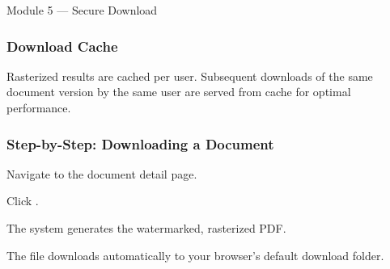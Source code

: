 \begin{ugModule}{Module 5 --- Secure Download}
  \subsubsection*{Download Cache}
  Rasterized results are cached per user. Subsequent downloads
  of the same document version by the same user are served from
  cache for optimal performance.

  \subsubsection*{Step-by-Step: Downloading a Document}
  \begin{ugSteps}
    \item Navigate to the document detail page.
    \item Click .
    \item The system generates the watermarked, rasterized PDF.
    \item The file downloads automatically to your browser's
          default download folder.
  \end{ugSteps}
\end{ugModule}

\vspace{10pt}

